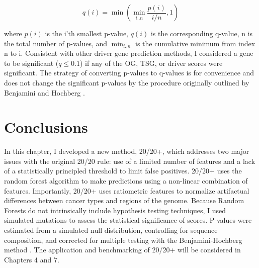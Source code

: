 \begin{equation}
q(i) = \min{\left(\min_{i..n}{\frac{p(i)}{i/n}}, 1 \right)}
\end{equation}

where $p(i)$ is the i'th smallest p-value, $q(i)$ is the corresponding q-value, n is the total number of p-values, and $\min_{i..n}$ is the cumulative minimum from index n to i. Consistent with other driver gene prediction methods, I considered a gene to be significant ($q \leq 0.1$) if any of the OG, TSG, or driver scores were significant. The strategy of converting p-values to q-values is for convenience and does not change the significant p-values by the procedure originally outlined by Benjamini and Hochberg \cite{RN94}.

\section{Conclusions}

In this chapter, I developed a new method, 20/20+, which addresses two major issues with the original 20/20 rule: use of a limited number of features and a lack of a statistically principled threshold to limit false positives. 20/20+ uses the random forest algorithm to make predictions using a non-linear combination of features. Importantly, 20/20+ uses ratiometric features to normalize artifactual differences between cancer types and regions of the genome. Because Random Forests do not intrinsically include hypothesis testing techniques, I used simulated mutations to assess the statistical significance of scores. P-values were estimated from a simulated null distribution, controlling for sequence composition, and corrected for multiple testing with the Benjamini-Hochberg method \cite{RN94}. The application and benchmarking of 20/20+ will be considered in Chapters 4 and 7.

